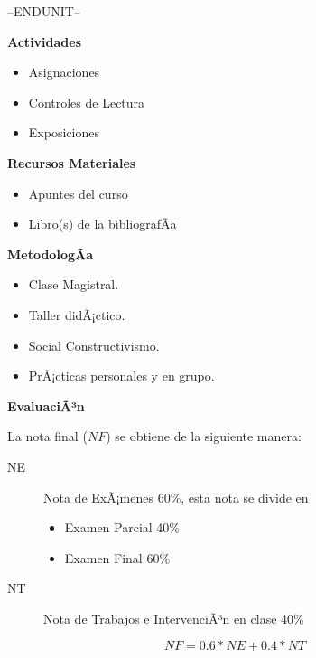 \documentclass[final]{article}
\begin{document}
--ENDUNIT--


\addtocounter{SyllabiSectionCount}{1}
{\bf {} Actividades}
\begin{itemize}
\item Asignaciones
\item Controles de Lectura
\item Exposiciones
\end{itemize} 

\addtocounter{SyllabiSectionCount}{1}
{\bf {} Recursos Materiales}
\begin{itemize}
\item Apuntes del curso
\item Libro(s) de la bibliografÃ­a
\end{itemize} 

\addtocounter{SyllabiSectionCount}{1}
{\bf {} MetodologÃ­a}
\begin{itemize}
\item Clase Magistral.
\item Taller didÃ¡ctico.
\item Social Constructivismo.
\item PrÃ¡cticas personales y en grupo.
\end{itemize} 

\addtocounter{SyllabiSectionCount}{1}
{\bf {} EvaluaciÃ³n}

\begin{evaluation}
\item La nota final ($NF$) se obtiene de la siguiente manera:
\begin{description}
	\item[NE] Nota de ExÃ¡menes 60\%, esta nota se divide en 
	\begin{itemize}
	    \item Examen Parcial 40\%
	    \item Examen Final 60\% 
	\end{itemize} 
	\item[NT] Nota de Trabajos e IntervenciÃ³n en clase 40\%
    \end{description} 
    \begin{displaymath}
    NF = 0.6*NE + 0.4*NT
    \end{displaymath}
\end{evaluation}
\end{document}
